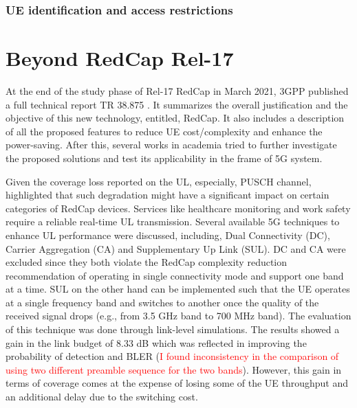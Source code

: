 \documentclass[conference]{IEEEtran}
\begin{document}
\subsubsection{UE identification and access restrictions}


\section{Beyond RedCap Rel-17}
\label{sec:7}



At the end of the study phase of Rel-17 RedCap in March 2021, 3GPP published a full technical report TR 38.875 \cite{3gpp_study_2021_38.875}. It summarizes the overall justification and the objective of this new technology, entitled, RedCap. It also includes a description of all the proposed features to reduce UE cost/complexity and enhance the power-saving. After this,  several works in academia tried to further investigate the proposed solutions and test its applicability in the frame of 5G system.

Given the coverage loss reported on the UL, especially, PUSCH channel, \cite{saafi_enhancing_2022} highlighted that such degradation might have a significant impact on certain categories of RedCap devices. Services like healthcare monitoring and work safety require a reliable real-time UL transmission. Several available 5G techniques to enhance UL performance were discussed, including, Dual Connectivity (DC), Carrier Aggregation (CA) and Supplementary Up Link (SUL). DC and CA were excluded since they both violate the RedCap complexity reduction recommendation of operating in single connectivity mode and support one band at a time. SUL on the other hand can be implemented such that the UE operates at a single frequency band and switches to another once the quality of the received signal drops (e.g., from 3.5 GHz band to 700 MHz band). The evaluation of this technique was done through link-level simulations. The results showed a gain in the link budget of 8.33 dB which was reflected in improving the probability of detection and BLER (\textcolor{red}{I found inconsistency in the comparison of using two different preamble sequence for the two bands}). However, this gain in terms of coverage comes at the expense of losing some of the UE throughput and an additional delay due to the switching cost.
\end{document}
